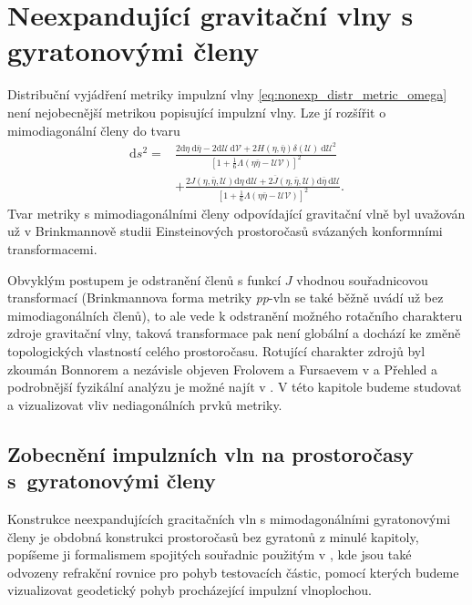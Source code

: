 \chapter{Neexpandující gravitační vlny s gyratonovými členy}
\label{chap:kap03}
Distribuční vyjádření metriky impulzní vlny \eqref{eq:nonexp_distr_metric_omega} není nejobecnější metrikou popisující
impulzní vlny. Lze jí rozšířit o mimodiagonální členy do tvaru
\begin{equation}
    \label{eq:nonexp_gyra_distrib_metric_omega}
    \begin{split}
        \mathrm{d}s^2=&\frac{2\mathrm{d}\eta~\mathrm{d}\bar{\eta} - 2 \mathrm{d}\mathcal{U}~\mathrm{d}\mathcal{V} + 2H(\eta, \bar{\eta}) \delta(\mathcal{U}) 
        ~\mathrm{d}\mathcal{U}^2}{\left[1+\frac{1}{6}\Lambda(\eta \bar{\eta}-\mathcal{U}\mathcal{V})\right]^2} \\
        &+ \frac{2J\left(\eta, \bar{\eta}, \mathcal{U}\right) \mathrm{d}\eta~\mathrm{d}\mathcal{U}
        +2\overline{J}\left(\eta, \bar{\eta}, \mathcal{U}\right) \mathrm{d}\bar{\eta}~\mathrm{d}\mathcal{U}}{\left[1+\frac{1}{6}\Lambda(\eta \bar{\eta}-\mathcal{U}\mathcal{V})\right]^2}.
    \end{split}
\end{equation}
Tvar metriky s mimodiagonálními členy odpovídající gravitační vlně byl uvažován už v Brinkmannově studii \cite{Brinkmann1925} Einsteinových prostoročasů svázaných konformními transformacemi.

Obvyklým postupem je odstranění členů s funkcí $J$ vhodnou souřadnicovou transformací (Brinkmannova forma metriky \emph{pp}-vln \cite{griffiths_podolsky_2009} se také běžně uvádí už bez mimodiagonálních členů), to ale vede k odstranění
možného rotačního charakteru zdroje gravitační vlny, taková transformace pak není globální a dochází ke změně topologických vlastností celého prostoročasu.
Rotující charakter zdrojů byl zkoumán Bonnorem \cite{Bonnor1970} a nezávisle objeven Frolovem a Fursaevem v \cite{Frolov2005_0} a \cite{Frolov2005} Přehled a podrobnější
fyzikální analýzu je možné najít v \cite{Podolsky2014}.
V této kapitole budeme studovat a vizualizovat vliv nediagonálních prvků metriky.

\section{Zobecnění impulzních vln na prostoročasy s~gyratonovými členy}
Konstrukce neexpandujících gracitačních vln s mimodagonálními gyratonovými členy je obdobná konstrukci prostoročasů bez gyratonů z minulé kapitoly, popíšeme ji formalismem spojitých souřadnic
použitým v \cite{Podolsky_2017}, kde jsou také odvozeny refrakční rovnice pro pohyb testovacích částic, pomocí kterých budeme vizualizovat geodetický pohyb procházející impulzní vlnoplochou.

